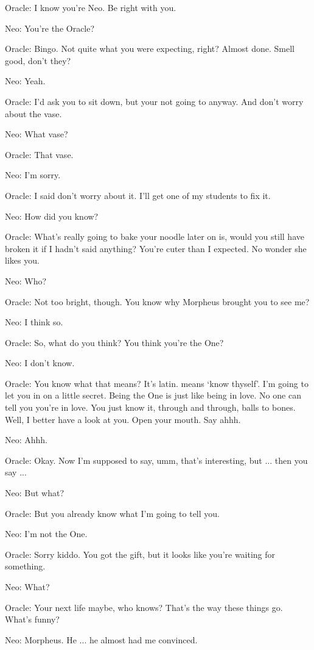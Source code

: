 \documentclass[UTF8]{ctexart}
\newenvironment{myquote}{\color{green} \setlength{\leftskip}{6em} \setlength{\rightskip}{4em} \setlength{\parindent}{-2em}}{\par}
\begin{document}
\begin{myquote}
Oracle: I know you're Neo. Be right with you.

Neo: You're the Oracle?

Oracle: Bingo. Not quite what you were expecting, right? Almost done. Smell good, don't they?

Neo: Yeah.

Oracle: I'd ask you to sit down, but your not going to anyway. And don't worry about the vase.

Neo: What vase?

Oracle: That vase.

Neo: I'm sorry.

Oracle: I said don't worry about it. I'll get one of my students to fix it.

Neo: How did you know?

Oracle: What's really going to bake your noodle later on is, would you still have broken it if I hadn't said anything? You're cuter than I expected. No wonder she likes you.

Neo: Who?

Oracle: Not too bright, though. You know why Morpheus brought you to see me?

Neo: I think so.

Oracle: So, what do you think? You think you're the One?

Neo: I don't know.

Oracle: You know what that means? It's latin. means `know thyself'. I'm going to let you in on a little secret. Being the One is just like being in love. No one can tell you you're in love. You just know it, through and through, balls to bones. Well, I better have a look at you. Open your mouth. Say ahhh.

Neo: Ahhh.

Oracle: Okay. Now I'm supposed to say, umm, that's interesting, but ... then you say ...

Neo: But what?

Oracle: But you already know what I'm going to tell you.

Neo: I'm not the One.

Oracle: Sorry kiddo. You got the gift, but it looks like you're waiting for something.

Neo: What?

Oracle: Your next life maybe, who knows? That's the way these things go. What's funny?

Neo: Morpheus. He ... he almost had me convinced.


\end{myquote}
\end{document}
